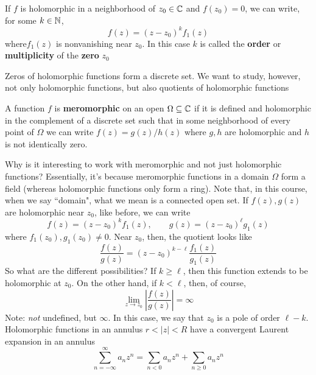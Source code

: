 \documentclass{article}
\begin{document}
\begin{definition}[Zero]
If \(f\) is holomorphic in a neighborhood of \(z_0 \in \mathbb{C}\) and \(f(z_0) = 0\), we can write, for some \(k \in \mathbb{N}\),
\begin{equation}f(z) = (z - z_0)^kf_1(z)\end{equation}
where\(f_1(z)\) is nonvanishing near \(z_0\). In this case \(k\) is called the \textbf{order} or \textbf{multiplicity} of the \textbf{zero} \(z_0\)
\end{definition}
Zeros of holomorphic functions form a discrete set. We want to study, however, not only holomorphic functions, but also quotients of holomorphic functions
\begin{definition}[Meromorphic]
A function \(f\) is \textbf{meromorphic} on an open \(\Omega \subseteq \mathbb{C}\) if it is defined and holomorphic in the complement of a discrete set such that in some neighborhood of every point of \(\Omega\) we can write
\(f(z) = g(z)/h(z)\)
where \(g, h\) are holomorphic and \(h\) is not identically zero.
\end{definition}
Why is it interesting to work with meromorphic and not just holomorphic functions? Essentially, it's because meromorphic functions in a domain \(\Omega\) form a field (whereas holomorphic functions only form a ring). Note that, in this course, when we say ``domain", what we mean is a connected open set.
If \(f(z), g(z)\) are holomorphic near \(z_0\), like before, we can write
\begin{equation}f(z) = (z - z_0)^kf_1(z), \qquad g(z) = (z - z_0)^\ell g_1(z)\end{equation}
where \(f_1(z_0), g_1(z_0) \neq 0\). Near \(z_0\), then, the quotient looks like
\begin{equation}\frac{f(z)}{g(z)} = (z - z_0)^{k - \ell}\frac{f_1(z)}{g_1(z)}\end{equation}
So what are the different possibilities? If \(k \geq \ell\), then this function extends to be holomorphic at \(z_0\). On the other hand, if \(k < \ell\), then, of course,
\begin{equation}\lim_{z \to z_0}\left|\frac{f(z)}{g(z)}\right| = \infty\end{equation}
Note: \textit{not} undefined, but \(\infty\). In this case, we say that \(z_0\) is a pole of order \(\ell - k\).
Holomorphic functions in an annulus \(r < |z| < R\) have a convergent Laurent expansion in an annulus
\begin{equation}\sum_{n = -\infty}^\infty a_nz^n = \sum_{n < 0}a_nz^n + \sum_{n \geq 0}a_nz^n\end{equation}
\end{document}
